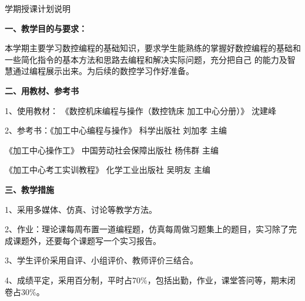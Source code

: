 \documentclass{ctexart}
\begin{document}
\lljk{} %

\jhsy %

\begin{center}
 \heiti 学期授课计划说明
\end{center}
 \setlength{\parindent}{2em} \setlength{\baselineskip}{22pt}

\textbf{一、教学目的与要求：}

本学期主要学习数控编程的基础知识，要求学生能熟练的掌握好数控编程的基础和一些简化指令的基本方法和思路去编程和解决实际问题，充分把自己 的能力及智慧通过编程展示出来。为后续的数控学习作好准备。

\textbf{二、用教材、参考书}

1、使用教材： 《数控机床编程与操作（数控铣床 加工中心分册）》 沈建峰

2、参考书：《加工中心编程与操作》  科学出版社  刘加孝   主编

\hspace{5em}《加工中心操作工》 中国劳动社会保障出版社  杨伟群  主编

\hspace{5em}《加工中心考工实训教程》  化学工业出版社   吴明友 主编

\textbf{三、教学措施}

1、采用多媒体、仿真、讨论等教学方法。

2、作业：理论课每周布置一道编程题，仿真每周做习题集上的题目，实习除了完成课题外，还要每个课题写一个实习报告。

3、学生评价采用自评、小组评价、教师评价三结合。

4、成绩平定，采用百分制，平时占70\%，包括出勤，作业，课堂答问等，期末闭卷占30\%。
\end{document}
